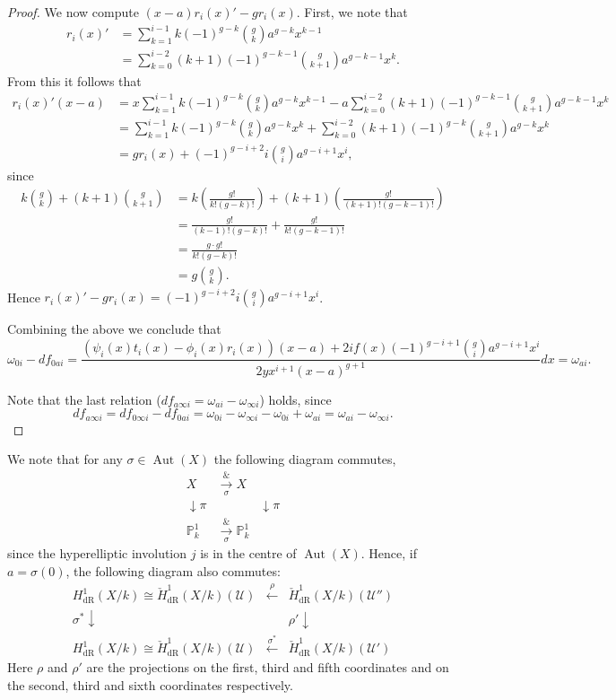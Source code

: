 \documentclass[11pt]{article} %
\theoremstyle{plain}
\theoremstyle{remark}
\newcommand{\cU}{{\mathcal U}}
\newcommand{\derhamhone}{H_{\text {dR}}^1(X/k)}
\newcommand{\cechderhamhone}{\check{H}_{\text {dR}}^1(X/k)}
\DeclareMathOperator{\aut}{Aut}
\begin{document}
\begin{proof}
We now compute $(x-a)r_i(x)'-gr_i(x)$.
First, we note that
\begin{align*}
r_i(x)' & = \sum_{k=1}^{i-1} k (-1)^{g-k} \binom{g}{k} a^{g-k} x^{k-1} \\
& = \sum_{k=0}^{i-2} (k+1) (-1)^{g-k-1} \binom{g}{k+1}a^{g-k-1} x^k.
\end{align*}
From this it follows that
\begin{align*}
r_i(x)'(x-a) & = x \sum_{k=1}^{i-1} k (-1)^{g-k} \binom{g}{k} a^{g-k} x^{k-1} - a \sum_{k=0}^{i-2} (k+1) (-1)^{g-k-1} \binom{g}{k+1}a^{g-k-1} x^k \\
& = \sum_{k=1}^{i-1} k (-1)^{g-k} \binom{g}{k} a^{g-k} x^k  + \sum_{k=0}^{i-2} (k+1) (-1)^{g-k} \binom{g}{k+1}a^{g-k} x^k \\
& = gr_i(x) + (-1)^{g-i+2}i \binom{g}{i}a^{g-i+1}x^i,
\end{align*}
since
\begin{align*}
k\binom{g}{k} + (k+1)\binom{g}{k+1} & = k \left( \frac{g!}{k!(g-k)!} \right) + (k+1) \left( \frac{g!}{(k+1)!(g-k-1)!} \right) \\
& = \frac{g!}{(k-1)!(g-k)!} + \frac{g!}{k!(g-k-1)!} \\
& = \frac{g\cdot g!}{k!(g-k)!} \\
& = g \binom{g}{k}.
\end{align*}
Hence $r_i(x)'-gr_i(x)= (-1)^{g-i+2}i\binom{g}{i} a^{g-i+1}x^i$. 

Combining the above we conclude that
\[
\omega_{0 i } - df_{0a i} =  \frac{(\psi_i(x)t_i(x) - \phi_i(x)r_i(x))(x-a) + 2if(x)(-1)^{g-i+1}\binom{g}{i} a^{g-i+1}x^i}{2yx^{i+1}(x-a)^{g+1}}dx= \omega_{a i}.
\]

Note that the last relation ($df_{a \infty i} = \omega_{a i} - \omega_{\infty i}$) holds, since 
\[
df_{a \infty i} = df_{0 \infty i} - df_{0 a i} = \omega_{0 i} - \omega_{\infty i } - \omega_{0 i} + \omega_{a i} = \omega_{a i} - \omega_{\infty i}.
\]
\end{proof}

We note that for any $\sigma \in \aut(X)$ the following diagram commutes,
\[
\begin{array}{ccc}
X & \xrightarrow[\sigma] & X \\
\downarrow\pi & & \downarrow\pi \\
\mathbb P^1_k & \xrightarrow[\sigma] & \mathbb P_k^1
\end{array}
\]
since the hyperelliptic involution $j$ is in the centre of $\aut(X)$.
Hence, if $a = \sigma(0)$, the following diagram also commutes:
\[
\begin{array}{ccc}
\derhamhone \cong \cechderhamhone(\cU)  & \xleftarrow{\rho} & \cechderhamhone(\cU'')  \\
\sigma^*\downarrow & ~ & \rho'\downarrow  \\
\derhamhone \cong \cechderhamhone(\cU)  & \xleftarrow{\sigma^*} & \cechderhamhone(\cU')
\end{array}
\]
Here $\rho$ and $\rho'$ are the projections on the first, third and fifth coordinates and on the second, third and sixth coordinates respectively.
\end{document}

